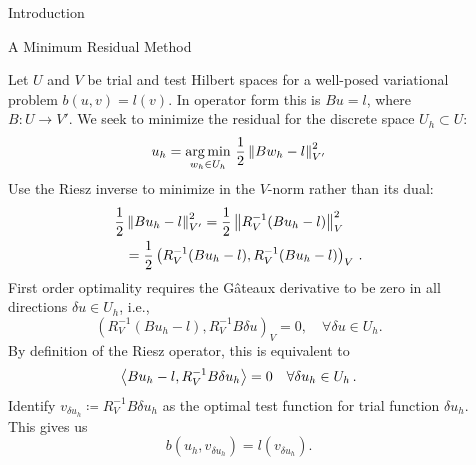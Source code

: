 \documentclass[final]{beamer}
\newlength{\sepwid}
\newlength{\onecolwid}
\begin{document}
\begin{frame}[t]
\begin{columns}[t]
\begin{column}{\onecolwid}
\begin{block}{Introduction}
\end{block}


\begin{block}{A Minimum Residual Method}

Let $U$ and $V$ be trial and test Hilbert spaces for a well-posed variational
problem $b(u,v)=l(v)$. In operator form this is $Bu=l$, where $B:U\rightarrow
V'$. We seek to minimize the residual for the discrete space $U_h\subset U$:
\[
u_{h} = \underset{w_{h} \in U_{h}} {\operatorname*{arg\,min}} \,\, \frac{1}{2}
\left\| Bw_{h}-l \right\|_{V'}^{2}
\]
Use the Riesz inverse to minimize in the $V$-norm rather than its dual:
\begin{align*}
\frac{1}{2}&\left\| Bu_h-l \right\|^2_{V'}=\frac{1}{2}\left\| R_V^{-1}(Bu_h-l) \right\|^2_V\\
&=\frac{1}{2}\left( R_V^{-1}(Bu_h-l),R_V^{-1}(Bu_h-l) \right)_V\,.
\end{align*}
First order optimality requires
the G\^ateaux derivative to be zero in all directions $\delta u \in
U_h$, i.e.,
\[
\left(R_V^{-1}(Bu_h-l),R_V^{-1}B\delta u\right)_V = 0, \quad \forall \delta u \in U_h.
\]
By definition of the Riesz operator, this is equivalent to
\begin{equation*}
\left\langle Bu_h-l,R_V^{-1}B\delta u_h \right\rangle=0\quad\forall\delta u_h\in U_h\,.
\end{equation*}
Identify $v_{\delta u_h}\coloneqq R_V^{-1}B\delta u_h$ as the
optimal test function for trial function $\delta u_h$. This gives us
\begin{equation*}
b(u_h,v_{\delta u_h})=l(v_{\delta u_h}).
\end{equation*}

\end{block}



\end{column} %

\begin{column}{\sepwid}\end{column} %


\begin{column}{\onecolwid} %


\end{column}
\end{columns}
\end{frame}
\end{document}
